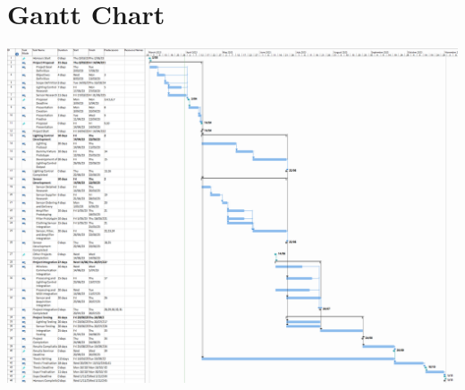 \chapter{Gantt Chart}\label{appendix:gantt}

\includegraphics[width=1\columnwidth]{chapters/project_plan/figures/Gantt_Chart}
